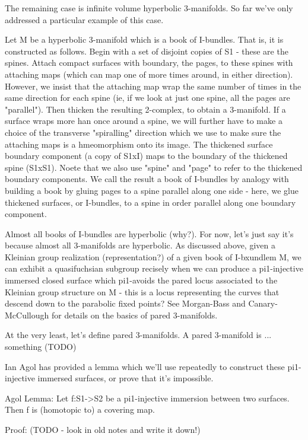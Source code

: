 \documentclass[12pt]{amsart}
\theoremstyle{definition}
\begin{document}
The remaining case is infinite volume hyperbolic 3-manifolds. So far we've only
addressed a particular example of this case.

Let M be a hyperbolic 3-manifold which is a book of I-bundles. That is, it is
constructed as follows. Begin with a set of disjoint copies of S1 - these are
the spines. Attach compact surfaces with boundary, the pages, to these spines
with attaching maps (which can map one of more times around, in either
direction). However, we insist that the attaching map wrap the same number of
times in the same direction for each spine (ie, if we look at just one spine,
all the pages are "parallel"). Then thicken the resulting 2-complex, to obtain
a 3-manifold. If a surface wraps more han once around a spine, we will further
have to make a choice of the transverse "spiralling" direction which we use to
make sure the attaching maps is a hmeomorphism onto its image. The thickened
surface boundary component (a copy of S1xI) maps to the boundary of the
thickened spine (S1xS1).  Noete that we also use "spine" and "page" to refer to
the thickened boundary components. We call the result a book of I-bundles by
analogy with building a book by gluing pages to a spine parallel along one side
- here, we glue thickened surfaces, or I-bundles, to a spine in order parallel
along one boundary component.

Almost all books of I-bundles are hyperbolic (why?). For now, let's just say
it's because almost all 3-manifolds are hyperbolic. As discussed above, given
a Kleinian group realization (representation?) of a given book of I-bxundlem M,
we can exhibit a quasifuchsian subgroup recisely when we can produce
a pi1-injective immersed closed surface which pi1-avoids the pared locus
associated to the Kleinian group structure on M - this is a locus representing
the curves that descend down to the parabolic fixed points? See Morgan-Bass and
Canary-McCullough for details on the basics of pared 3-manifolds.

At the very least, let's define pared 3-manifolds. A pared 3-manifold is ...
something (TODO)

Ian Agol has provided a lemma which we'll use repeatedly to construct these
pi1-injective immersed surfaces, or prove that it's impossible.

Agol Lemma: Let f:S1->S2 be a pi1-injective immersion between two surfaces.
Then f is (homotopic to) a covering map.

Proof: (TODO - look in old notes and write it down!)
\end{document}
